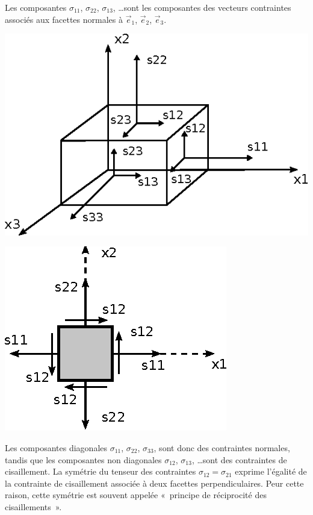 Les composantes $\sigma_{11}$, $\sigma_{22}$, $\sigma_{13}$, \dots sont les composantes des vecteurs contraintes associés aux facettes normales à $\vec{e}_1$, $\vec{e}_2$, $\vec{e}_3$.
\begin{multicols}{2}
    \begin{center}
        \includegraphics{../images/T1_Ch02-0004}
    \end{center}
    \columnbreak
    \begin{center}
        \includegraphics{../images/T1_Ch02-0005}
    \end{center}
\end{multicols}
Les composantes diagonales $\sigma_{11}$, $\sigma_{22}$, $\sigma_{33}$, sont donc des contraintes normales, tandis que les composantes non diagonales $\sigma_{12}$, $\sigma_{13}$, \dots sont des contraintes de cisaillement.
La symétrie du tenseur des contraintes $\sigma_{12} = \sigma_{21}$ exprime l'égalité de la contrainte de cisaillement associée à deux facettes perpendiculaires.
Peur cette raison, cette symétrie est souvent appelée «~principe de réciprocité des cisaillements~».

